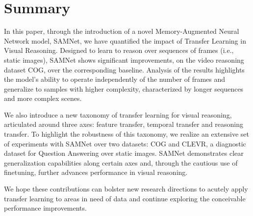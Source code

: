 \section{Summary}


In this paper, through the introduction of a novel Memory-Augmented Neural Network model, SAMNet, we have quantified the impact of Transfer Learning in Visual Reasoning. Designed to learn to reason over sequences of frames (i.e., static images), SAMNet shows significant improvements, on the video reasoning dataset COG, over the corresponding baseline. Analysis of the results highlights the model's ability to operate independently of the number of frames and generalize to samples with higher complexity, characterized by longer sequences and more complex scenes.

We also introduce a new taxonomy of transfer learning for visual reasoning, articulated around three axes: feature transfer, temporal transfer and reasoning transfer. To highlight the robustness of this taxonomy, we realize an extensive set of experiments with SAMNet over two datasets: COG and CLEVR, a diagnostic dataset for Question Answering over static images. SAMNet demonstrates clear generalization capabilities along certain axes and, through the cautious use of finetuning, further advances performance in visual reasoning.

We hope these contributions can bolster new research directions to acutely apply transfer learning to areas in need of data and continue exploring the conceivable performance improvements.
